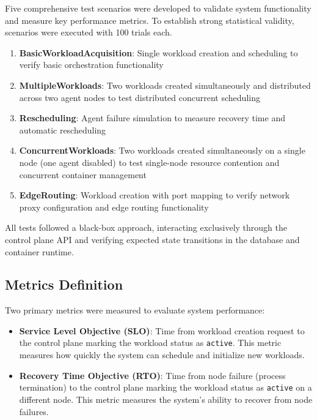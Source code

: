 Five comprehensive test scenarios were developed to validate system functionality and measure key performance metrics. To establish strong statistical validity, scenarios were executed with 100 trials each.

\begin{enumerate}
\item \textbf{BasicWorkloadAcquisition}: Single workload creation and scheduling to verify basic orchestration functionality
\item \textbf{MultipleWorkloads}: Two workloads created simultaneously and distributed across two agent nodes to test distributed concurrent scheduling
\item \textbf{Rescheduling}: Agent failure simulation to measure recovery time and automatic rescheduling
\item \textbf{ConcurrentWorkloads}: Two workloads created simultaneously on a single node (one agent disabled) to test single-node resource contention and concurrent container management
\item \textbf{EdgeRouting}: Workload creation with port mapping to verify network proxy configuration and edge routing functionality
\end{enumerate}

All tests followed a black-box approach, interacting exclusively through the control plane API and verifying expected state transitions in the database and container runtime.

\subsection{Metrics Definition}

Two primary metrics were measured to evaluate system performance:

\begin{itemize}
\item \textbf{Service Level Objective (SLO)}: Time from workload creation request to the control plane marking the workload status as \texttt{active}. This metric measures how quickly the system can schedule and initialize new workloads.

\item \textbf{Recovery Time Objective (RTO)}: Time from node failure (process termination) to the control plane marking the workload status as \texttt{active} on a different node. This metric measures the system's ability to recover from node failures.
\end{itemize}

